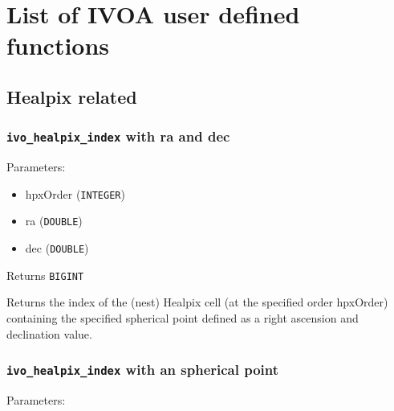 \documentclass[11pt,a4paper]{ivoa}
\begin{document}
\centering





\section{List of IVOA user defined functions}
\subsection{Healpix related}
\subsubsection{\texttt{ivo\_healpix\_index} with ra and dec}

Parameters:

\begin{itemize}
	\item hpxOrder (\texttt{INTEGER})
	\item ra (\texttt{DOUBLE})
	\item dec (\texttt{DOUBLE})
\end{itemize}

Returns \texttt{BIGINT}

Returns the index of the (nest) Healpix cell (at the specified order
hpxOrder) containing the specified spherical point defined as a right
ascension and declination value.

\subsubsection{\texttt{ivo\_healpix\_index} with an spherical point}

Parameters:
\end{document}
